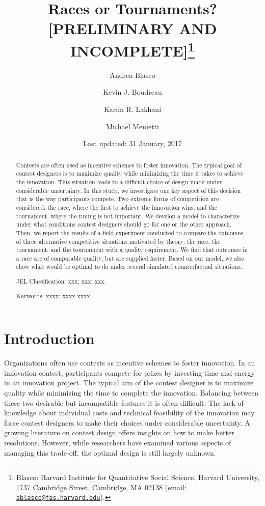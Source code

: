 \documentclass[12pt,]{article}
\title{Races or Tournaments? {[}PRELIMINARY AND INCOMPLETE{]}\thanks{Blasco: Harvard Institute for Quantitative Social Science, Harvard
University, 1737 Cambridge Street, Cambridge, MA 02138 (email:
\href{mailto:ablasco@fas.harvard.edu}{\nolinkurl{ablasco@fas.harvard.edu}}).}}
\author{Andrea Blasco \and Kevin J. Boudreau \and Karim R. Lakhani \and Michael Menietti}
\date{Last updated: 31 January, 2017}
\begin{document}
\maketitle
\begin{abstract}
Contests are often used as incentive schemes to foster innovation. The
typical goal of contest designers is to maximize quality while
minimizing the time it takes to achieve the innovation. This situation
leads to a difficult choice of design made under considerable
uncertainty. In this study, we investigate one key aspect of this
decision that is the way participants compete. Two extreme forms of
competition are considered: the race, where the first to achieve the
innovation wins, and the tournament, where the timing is not important.
We develop a model to characterize under what conditions contest
designers should go for one or the other approach. Then, we report the
results of a field experiment conducted to compare the outcomes of three
alternative competitive situations motivated by theory: the race, the
tournament, and the tournament with a quality requirement. We find that
outcomes in a race are of comparable quality, but are supplied faster.
Based on our model, we also show what would be optimal to do under
several simulated counterfactual situations.

\smallskip\noindent 
JEL Classification: xxx; xxx; xxx.

\smallskip\noindent 
Keywords: xxxx; xxxx xxxx.
\end{abstract}


\clearpage
\tableofcontents
\setcounter{tocdepth}{2}
\clearpage

\section{Introduction}\label{introduction}

Organizations often use contests as incentive schemes to foster
innovation. In an innovation contest, participants compete for prizes by
investing time and energy in an innovation project. The typical aim of
the contest designer is to maximize quality while minimizing the time to
complete the innovation. Balancing between these two desirable but
incompatible features it is often difficult. The lack of knowledge about
individual costs and technical feasibility of the innovation may force
contest designers to make their choices under considerable uncertainty.
A growing literature on contest design offers insights on how to make
better resolutions. However, while researchers have examined various
aspects of managing this trade-off, the optimal design is still largely
unknown.
\end{document}
